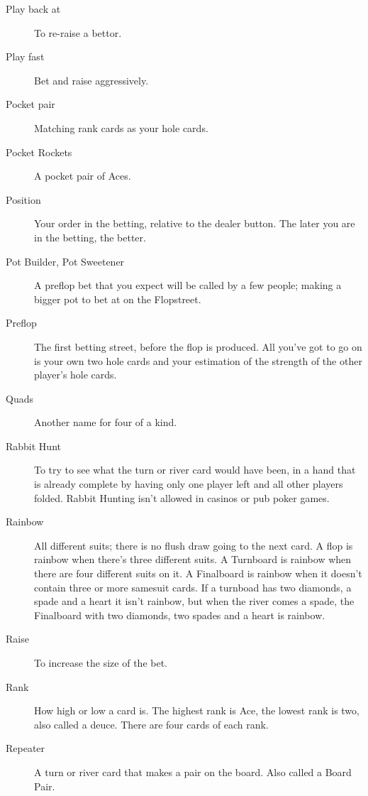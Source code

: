 \begin{description}
\item[Play back at] To re-raise a bettor.

\item[Play fast] Bet and raise aggressively.

\item[Pocket pair] Matching rank cards as your hole cards.

\item[Pocket Rockets] A pocket pair of Aces.

\item[Position] Your order in the betting, relative to the dealer
button. The later you are in the betting, the better.

\item[Pot Builder, Pot Sweetener] A preflop bet that you expect will
be called by a few people; making a bigger pot to bet at on the
Flopstreet.

\item[Preflop] The first betting street, before the flop is produced.
All you've got to go on is your own two hole cards and your estimation
of the strength of the other player's hole cards.

\item[Quads] Another name for four of a kind.

\item[Rabbit Hunt] To try to see what the turn or river card would
have been, in a hand that is already complete by having only one
player left and all other players folded. Rabbit Hunting isn't allowed
in casinos or pub poker games.

\item[Rainbow] All different suits; there is no flush
draw going to the next card. A flop is rainbow when there's three
different suits. A Turnboard is rainbow when there are four different
suits on it. A Finalboard is rainbow when it doesn't contain
three or more samesuit cards. If a turnboad has two diamonds, a
spade and a heart it isn't rainbow, but when the river comes a spade,
the Finalboard with two diamonds, two spades and a heart is rainbow.

\item[Raise] To increase the size of the bet.

\item[Rank] How high or low a card is. The highest rank is Ace, the
lowest rank is two, also called a deuce. There are four cards of
each rank.

\item[Repeater] A turn or river card that makes a pair on the
board. Also called a Board Pair.


\end{description}
